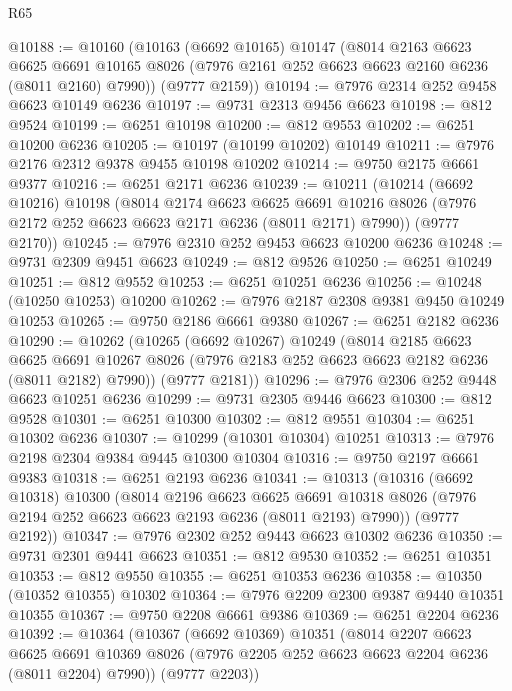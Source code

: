 \begin{lexlean}{R65}
\begin{coremodule}
{@10188 := @10160
    (@10163
      (@6692 @10165)
      @10147
      (@8014
        @2163
        @6623
        @6625
        @6691
        @10165
        @8026
        (@7976 @2161 @252 @6623 @6623 @2160 @6236 (@8011 @2160) @7990))
      (@9777 @2159))
@10194 := @7976 @2314 @252 @9458 @6623 @10149 @6236
@10197 := @9731 @2313 @9456 @6623
@10198 := @812 @9524
@10199 := @6251 @10198
@10200 := @812 @9553
@10202 := @6251 @10200 @6236
@10205 := @10197 (@10199 @10202) @10149
@10211 := @7976 @2176 @2312 @9378 @9455 @10198 @10202
@10214 := @9750 @2175 @6661 @9377
@10216 := @6251 @2171 @6236
@10239 := @10211
    (@10214
      (@6692 @10216)
      @10198
      (@8014
        @2174
        @6623
        @6625
        @6691
        @10216
        @8026
        (@7976 @2172 @252 @6623 @6623 @2171 @6236 (@8011 @2171) @7990))
      (@9777 @2170))
@10245 := @7976 @2310 @252 @9453 @6623 @10200 @6236
@10248 := @9731 @2309 @9451 @6623
@10249 := @812 @9526
@10250 := @6251 @10249
@10251 := @812 @9552
@10253 := @6251 @10251 @6236
@10256 := @10248 (@10250 @10253) @10200
@10262 := @7976 @2187 @2308 @9381 @9450 @10249 @10253
@10265 := @9750 @2186 @6661 @9380
@10267 := @6251 @2182 @6236
@10290 := @10262
    (@10265
      (@6692 @10267)
      @10249
      (@8014
        @2185
        @6623
        @6625
        @6691
        @10267
        @8026
        (@7976 @2183 @252 @6623 @6623 @2182 @6236 (@8011 @2182) @7990))
      (@9777 @2181))
@10296 := @7976 @2306 @252 @9448 @6623 @10251 @6236
@10299 := @9731 @2305 @9446 @6623
@10300 := @812 @9528
@10301 := @6251 @10300
@10302 := @812 @9551
@10304 := @6251 @10302 @6236
@10307 := @10299 (@10301 @10304) @10251
@10313 := @7976 @2198 @2304 @9384 @9445 @10300 @10304
@10316 := @9750 @2197 @6661 @9383
@10318 := @6251 @2193 @6236
@10341 := @10313
    (@10316
      (@6692 @10318)
      @10300
      (@8014
        @2196
        @6623
        @6625
        @6691
        @10318
        @8026
        (@7976 @2194 @252 @6623 @6623 @2193 @6236 (@8011 @2193) @7990))
      (@9777 @2192))
@10347 := @7976 @2302 @252 @9443 @6623 @10302 @6236
@10350 := @9731 @2301 @9441 @6623
@10351 := @812 @9530
@10352 := @6251 @10351
@10353 := @812 @9550
@10355 := @6251 @10353 @6236
@10358 := @10350 (@10352 @10355) @10302
@10364 := @7976 @2209 @2300 @9387 @9440 @10351 @10355
@10367 := @9750 @2208 @6661 @9386
@10369 := @6251 @2204 @6236
@10392 := @10364
    (@10367
      (@6692 @10369)
      @10351
      (@8014
        @2207
        @6623
        @6625
        @6691
        @10369
        @8026
        (@7976 @2205 @252 @6623 @6623 @2204 @6236 (@8011 @2204) @7990))
      (@9777 @2203))
}
\end{coremodule}
\end{lexlean}
